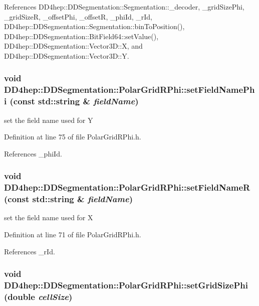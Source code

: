 References DD4hep::DDSegmentation::Segmentation::\_\-decoder, \_\-gridSizePhi, \_\-gridSizeR, \_\-offsetPhi, \_\-offsetR, \_\-phiId, \_\-rId, DD4hep::DDSegmentation::Segmentation::binToPosition(), DD4hep::DDSegmentation::BitField64::setValue(), DD4hep::DDSegmentation::Vector3D::X, and DD4hep::DDSegmentation::Vector3D::Y.\hypertarget{class_d_d4hep_1_1_d_d_segmentation_1_1_polar_grid_r_phi_ae7613ded8629daf8dc2d23160b7f3206}{
\subsubsection[{setFieldNamePhi}]{\setlength{\rightskip}{0pt plus 5cm}void DD4hep::DDSegmentation::PolarGridRPhi::setFieldNamePhi (const std::string \& {\em fieldName})}}
\label{class_d_d4hep_1_1_d_d_segmentation_1_1_polar_grid_r_phi_ae7613ded8629daf8dc2d23160b7f3206}


set the field name used for Y 

Definition at line 75 of file PolarGridRPhi.h.

References \_\-phiId.\hypertarget{class_d_d4hep_1_1_d_d_segmentation_1_1_polar_grid_r_phi_a8ea0d5863004fc7dc74a592ed631cd36}{
\subsubsection[{setFieldNameR}]{\setlength{\rightskip}{0pt plus 5cm}void DD4hep::DDSegmentation::PolarGridRPhi::setFieldNameR (const std::string \& {\em fieldName})}}
\label{class_d_d4hep_1_1_d_d_segmentation_1_1_polar_grid_r_phi_a8ea0d5863004fc7dc74a592ed631cd36}


set the field name used for X 

Definition at line 71 of file PolarGridRPhi.h.

References \_\-rId.\hypertarget{class_d_d4hep_1_1_d_d_segmentation_1_1_polar_grid_r_phi_af50d9792d10242bbc70cbd07709bc82b}{
\subsubsection[{setGridSizePhi}]{\setlength{\rightskip}{0pt plus 5cm}void DD4hep::DDSegmentation::PolarGridRPhi::setGridSizePhi (double {\em cellSize})}}
\label{class_d_d4hep_1_1_d_d_segmentation_1_1_polar_grid_r_phi_af50d9792d10242bbc70cbd07709bc82b}


